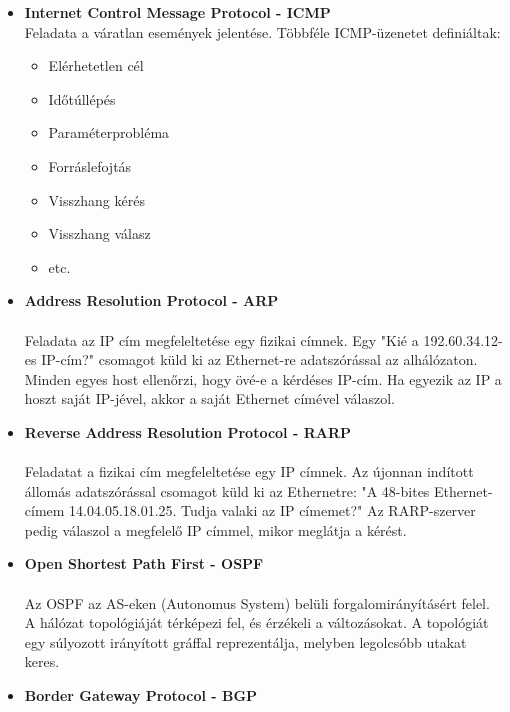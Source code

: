 \documentclass[12pt]{article}
\begin{document}
	\begin{itemize}[leftmargin=7.5mm]
        \renewcommand{\labelitemi}{$\vcenter{\hbox{\tiny$\bullet$}}$}
        \item \textbf{\small Internet Control Message Protocol - ICMP} \\
        Feladata a váratlan események jelentése. Többféle ICMP-üzenetet definiáltak:
        \begin{itemize}[leftmargin=7.5mm]
            \renewcommand{\labelitemii}{$\vcenter{\hbox{\tiny$\circ$}}$}
            \item Elérhetetlen cél
            \item Időtúllépés
            \item Paraméterprobléma
            \item Forráslefojtás
            \item Visszhang kérés
            \item Visszhang válasz
            \item etc.
        \end{itemize}
        \item \textbf{\small Address Resolution Protocol - ARP} \\\\
        Feladata az IP cím megfeleltetése egy fizikai címnek. Egy "Kié a 192.60.34.12-es IP-cím?" csomagot küld ki az Ethernet-re adatszórással az alhálózaton. Minden egyes host ellenőrzi, hogy övé-e a kérdéses IP-cím. Ha egyezik az IP a hoszt saját IP-jével, akkor a saját Ethernet címével válaszol.
        \item \textbf{\small Reverse Address Resolution Protocol - RARP} \\\\
        Feladatat a fizikai cím megfeleltetése egy IP címnek. Az újonnan indított állomás adatszórással csomagot küld ki az Ethernetre: "A 48-bites Ethernet-címem 14.04.05.18.01.25. Tudja valaki az IP címemet?" Az RARP-szerver pedig válaszol a megfelelő IP címmel, mikor meglátja a kérést.
        \item \textbf{\small Open Shortest Path First - OSPF} \\\\
        Az OSPF az AS-eken (Autonomus System) belüli forgalomirányításért felel. A hálózat topológiáját térképezi fel, és érzékeli a változásokat. A topológiát egy súlyozott irányított gráffal reprezentálja, melyben legolcsóbb utakat keres.
        \item \textbf{\small Border Gateway Protocol - BGP} \\\\

\end{itemize}
\end{document}
